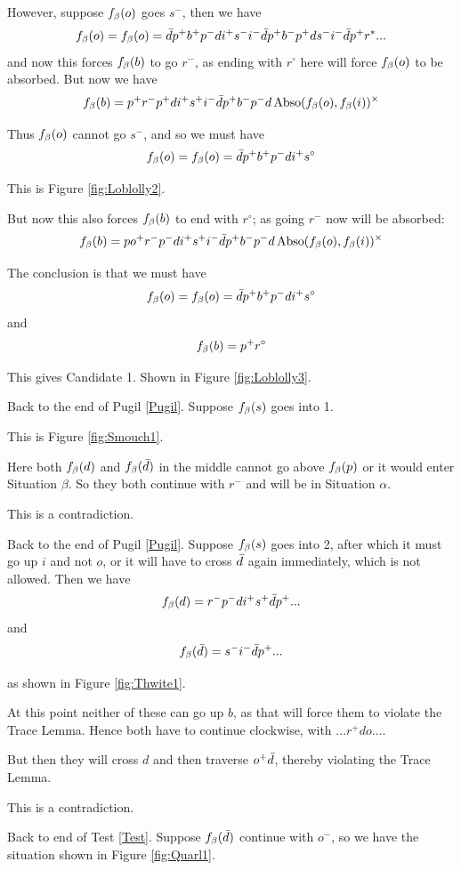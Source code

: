 However, suppose $f_\beta(o)$ goes $s^-$, then we have
\[
f_\beta(o) = f_\beta(o) = \bar{d} p^+ b^+ p^- d i^+ s^-i^-\bar{d} p^+ b^- p^+ d s^- i^-  \bar{d} p^+ r^*...
\]
and now this forces $f_\beta(b)$ to go $r^-$, as ending with $r^\circ$ here will force $f_\beta(o)$ to be absorbed. But now we have
\[
f_\beta(b) = p^+r^-p^+ d i^+ s^+ i^- \bar{d} p^+ b^- p^- d \operatorname{Abso}(f_\beta(o), f_\beta(i))^\times
\]


Thus $f_\beta(o)$ cannot go $s^-$, and so we must have
\[
f_\beta(o) = f_\beta(o) = \bar{d} p^+ b^+ p^- d i^+ s^\circ
\]

This is Figure \ref{fig:Loblolly2}.

But now this also forces $f_\beta(b)$ to end with $r^\circ$; as going $r^-$ now will be absorbed:
\[
f_\beta(b) = po^+r^- p^-  d i^+s^+ i^- \bar{d} p^+ b^- p^- d \operatorname{Abso}(f_\beta(o), f_\beta(i))^\times
\]

The conclusion is that we must have
\[
f_\beta(o) = f_\beta(o) = \bar{d} p^+ b^+ p^- d i^+ s^\circ
\]
and
\[
f_\beta(b) = p^+r^\circ
\]

This gives Candidate 1. Shown in Figure \ref{fig:Loblolly3}.

\label{Smouch}
Back to the end of Pugil \ref{Pugil}. Suppose $f_\beta(s)$ goes into 1.

This is Figure \ref{fig:Smouch1}.

Here both $f_\beta(d)$ and $f_\beta(\bar{d})$ in the middle cannot go above $f_\beta(p)$ or it would enter Situation $\beta$. So they both continue with $r^-$ and will be in Situation $\alpha$.

This is a contradiction.

\label{Thwite}
Back to the end of Pugil \ref{Pugil}. Suppose $f_\beta(s)$ goes into 2, after which it must go up $i$ and not $o$, or it will have to cross $\bar{d}$ again immediately, which is not allowed. Then we have
\[
f_\beta(d) = r^- p^- d i^+ s^+ \bar{d} p^+...
\]
and
\[
f_\beta(\bar{d}) = s^- i^- \bar{d} p^+...
\]

as shown in Figure \ref{fig:Thwite1}.

At this point neither of these can go up $b$, as that will force them to violate the Trace Lemma. Hence both have to continue clockwise, with $...r^+ d o...$. 

But then they will cross $d$ and then traverse $o^+ \bar{d}$, thereby violating the Trace Lemma.

This is a contradiction.

 \label{Quarl}
Back to end of Test \ref{Test}. Suppose $f_\beta(\bar{d})$ continue with $o^-$, so we have the situation shown in Figure \ref{fig:Quarl1}.

